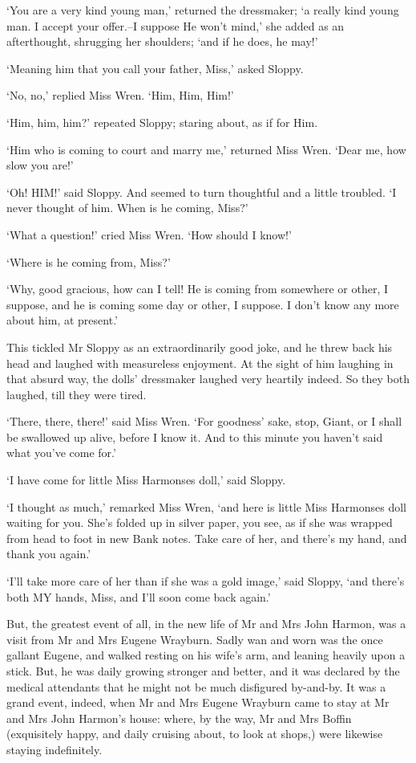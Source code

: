 ‘You are a very kind young man,’ returned the dressmaker; ‘a really kind
young man. I accept your offer.--I suppose He won’t mind,’ she added as
an afterthought, shrugging her shoulders; ‘and if he does, he may!’

‘Meaning him that you call your father, Miss,’ asked Sloppy.

‘No, no,’ replied Miss Wren. ‘Him, Him, Him!’

‘Him, him, him?’ repeated Sloppy; staring about, as if for Him.

‘Him who is coming to court and marry me,’ returned Miss Wren. ‘Dear me,
how slow you are!’

‘Oh! HIM!’ said Sloppy. And seemed to turn thoughtful and a little
troubled. ‘I never thought of him. When is he coming, Miss?’

‘What a question!’ cried Miss Wren. ‘How should I know!’

‘Where is he coming from, Miss?’

‘Why, good gracious, how can I tell! He is coming from somewhere or
other, I suppose, and he is coming some day or other, I suppose. I don’t
know any more about him, at present.’

This tickled Mr Sloppy as an extraordinarily good joke, and he threw
back his head and laughed with measureless enjoyment. At the sight of
him laughing in that absurd way, the dolls’ dressmaker laughed very
heartily indeed. So they both laughed, till they were tired.

‘There, there, there!’ said Miss Wren. ‘For goodness’ sake, stop, Giant,
or I shall be swallowed up alive, before I know it. And to this minute
you haven’t said what you’ve come for.’

‘I have come for little Miss Harmonses doll,’ said Sloppy.

‘I thought as much,’ remarked Miss Wren, ‘and here is little Miss
Harmonses doll waiting for you. She’s folded up in silver paper, you
see, as if she was wrapped from head to foot in new Bank notes. Take
care of her, and there’s my hand, and thank you again.’

‘I’ll take more care of her than if she was a gold image,’ said Sloppy,
‘and there’s both MY hands, Miss, and I’ll soon come back again.’


But, the greatest event of all, in the new life of Mr and Mrs John
Harmon, was a visit from Mr and Mrs Eugene Wrayburn. Sadly wan and worn
was the once gallant Eugene, and walked resting on his wife’s arm, and
leaning heavily upon a stick. But, he was daily growing stronger and
better, and it was declared by the medical attendants that he might not
be much disfigured by-and-by. It was a grand event, indeed, when Mr
and Mrs Eugene Wrayburn came to stay at Mr and Mrs John Harmon’s house:
where, by the way, Mr and Mrs Boffin (exquisitely happy, and daily
cruising about, to look at shops,) were likewise staying indefinitely.

